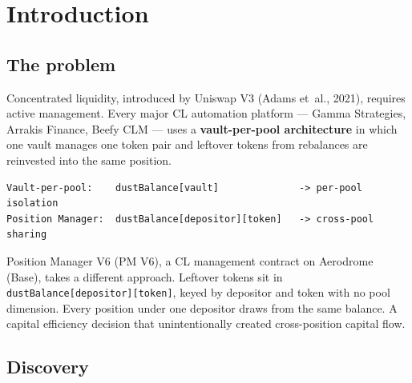 \documentclass[11pt,a4paper]{article}
\begin{document}
\begin{abstract}
I prove that a position rebalancing repeatedly without swap correction ($S = 0$) decays geometrically: $V_K \leq V_0(1 - \alpha_{\min})^K$ where $\alpha_{\min}$ is the minimum residual fraction across $K$ consecutive donation events (Theorem~\ref{thm:extinction}). The bound follows from the CL amount equations, the $\min$ constraint in the liquidity-from-amounts function, and the finiteness of the shared dust pool. The theorem is verified with four additional Foundry tests and validated against the complete lifecycle of a USDC/ZARP position that lost $99.8\%$ of its capital ($\text{\$942} \to \text{\$1.59}$) in 14 zero-swap rebalances over 65 hours; the extinction bound predicted 11 rebalances at the observed average leak rate, against 10 donation events observed.
\end{abstract}

\section{Introduction}\label{sec:introduction}

\subsection{The problem}\label{sec:problem}

Concentrated liquidity, introduced by Uniswap V3 (Adams et~al., 2021), requires active management. Every major CL automation platform --- Gamma Strategies, Arrakis Finance, Beefy CLM --- uses a \textbf{vault-per-pool architecture} in which one vault manages one token pair and leftover tokens from rebalances are reinvested into the same position.

\begin{verbatim}
Vault-per-pool:    dustBalance[vault]              -> per-pool isolation
Position Manager:  dustBalance[depositor][token]   -> cross-pool sharing
\end{verbatim}

Position Manager V6 (PM V6), a CL management contract on Aerodrome (Base), takes a different approach. Leftover tokens sit in \texttt{dustBalance[depositor][token]}, keyed by depositor and token with no pool dimension. Every position under one depositor draws from the same balance. A capital efficiency decision that unintentionally created cross-position capital flow.

\subsection{Discovery}\label{sec:discovery}
\end{document}
